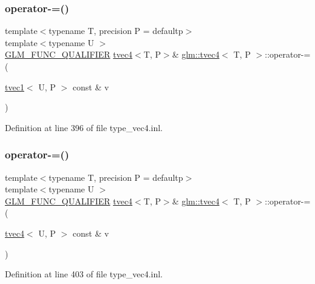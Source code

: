 \subsubsection{\texorpdfstring{operator-\/=()}{operator-=()}\hspace{0.1cm}{\footnotesize\ttfamily [5/6]}}
{\footnotesize\ttfamily template$<$typename T, precision P = defaultp$>$ \\
template$<$typename U $>$ \\
\mbox{\hyperlink{setup_8hpp_a33fdea6f91c5f834105f7415e2a64407}{G\+L\+M\+\_\+\+F\+U\+N\+C\+\_\+\+Q\+U\+A\+L\+I\+F\+I\+ER}} \mbox{\hyperlink{structglm_1_1tvec4}{tvec4}}$<$T, P$>$\& \mbox{\hyperlink{structglm_1_1tvec4}{glm\+::tvec4}}$<$ T, P $>$\+::operator-\/= (\begin{DoxyParamCaption}\item[{\mbox{\hyperlink{structglm_1_1tvec1}{tvec1}}$<$ U, P $>$ const \&}]{v }\end{DoxyParamCaption})}



Definition at line 396 of file type\+\_\+vec4.\+inl.

\mbox{\label{structglm_1_1tvec4_a75d65a025aeea5e7351d8c0113fabebb}} 
\subsubsection{\texorpdfstring{operator-\/=()}{operator-=()}\hspace{0.1cm}{\footnotesize\ttfamily [6/6]}}
{\footnotesize\ttfamily template$<$typename T, precision P = defaultp$>$ \\
template$<$typename U $>$ \\
\mbox{\hyperlink{setup_8hpp_a33fdea6f91c5f834105f7415e2a64407}{G\+L\+M\+\_\+\+F\+U\+N\+C\+\_\+\+Q\+U\+A\+L\+I\+F\+I\+ER}} \mbox{\hyperlink{structglm_1_1tvec4}{tvec4}}$<$T, P$>$\& \mbox{\hyperlink{structglm_1_1tvec4}{glm\+::tvec4}}$<$ T, P $>$\+::operator-\/= (\begin{DoxyParamCaption}\item[{\mbox{\hyperlink{structglm_1_1tvec4}{tvec4}}$<$ U, P $>$ const \&}]{v }\end{DoxyParamCaption})}



Definition at line 403 of file type\+\_\+vec4.\+inl.

